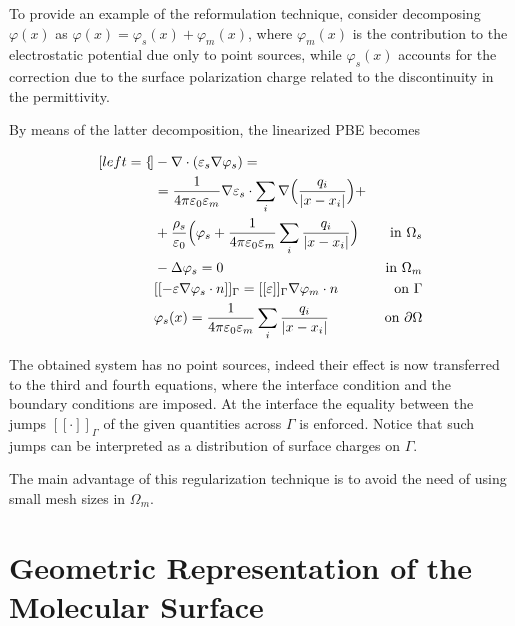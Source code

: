 \documentclass[11pt,a4paper,twocolumn]{article}
\begin{document}
To provide an example of the reformulation technique, consider decomposing $\varphi (x)$ as 
$\varphi (x) = \varphi_s (x) + \varphi_m (x)$, where $\varphi_m (x)$  is the
contribution to the electrostatic potential due only to point sources, while $\varphi_s (x)$ accounts
for the correction due to the surface polarization charge related to the discontinuity in the permittivity. 

By means of the latter decomposition, the linearized PBE becomes

\begin{subequations}
    \begin{align*}[left=\empheqlbrace]
    & - \nabla\cdot ( \varepsilon_s  \nabla \varphi_s) = \\ 
    & = \frac{1}{4 \pi \varepsilon_0 \varepsilon_m} \nabla \varepsilon_s \cdot \sum_i \nabla \Big( \frac{q_i}{|x - x_i|} \Big) + \\ 
    & + \frac{\rho_s}{\varepsilon_0} \Big(\varphi_s  + \frac{1}{4 \pi \varepsilon_0 \varepsilon_m} \sum_i \frac{q_i}{|x - x_i |} \Big) & \mbox{ in } \Omega_s \\
    & - \Delta \varphi_s = 0 & \mbox{ in } \Omega_m  \\
    & [[- \varepsilon \nabla \varphi_s \cdot n]]_{\Gamma} = [[ \varepsilon]]_{\Gamma} \nabla \varphi_m \cdot n & \mbox{ on } \Gamma  \\
    & \varphi_s (x) = \frac{1}{4 \pi \varepsilon_0 \varepsilon_m} \sum_i \frac{q_i}{|x - x_i|} & \mbox{ on } \partial \Omega 
    \end{align*}
\end{subequations}

The obtained system has no point sources, indeed their effect is now transferred to the third and fourth equations, where the interface condition and the boundary conditions are imposed. At the interface the equality between the jumps $[[ \cdot ]]_\Gamma$ of the given quantities across $\Gamma$ is enforced.
Notice that such jumps can be interpreted as a distribution of surface charges on $\Gamma$.  

The main advantage of this regularization technique is
to avoid the need of using small mesh sizes in $\Omega_m$.

\section{Geometric Representation of the Molecular Surface}
\label{sec:surface}
\end{document}
